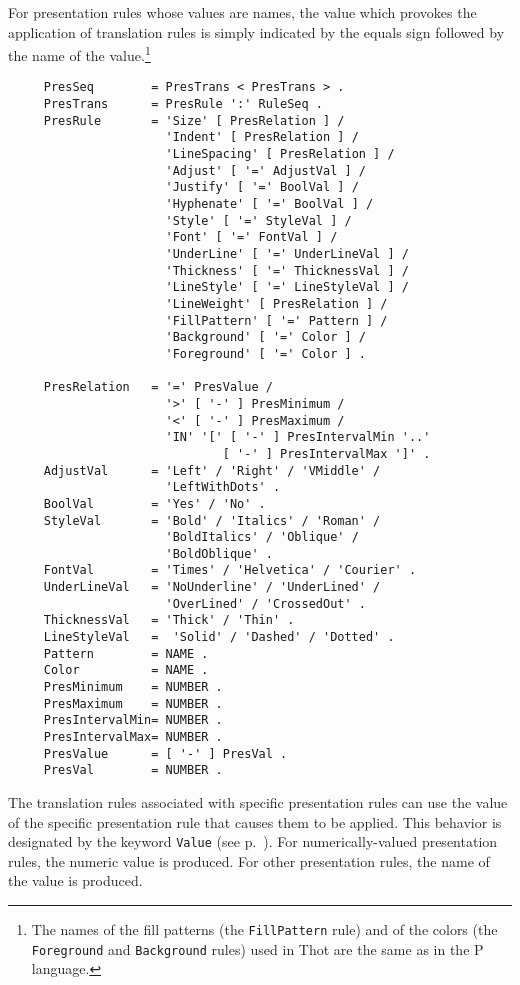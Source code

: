 For presentation rules whose values are names, the value which
provokes the application of translation rules is simply indicated by
the equals sign followed by the name of the value.\footnote{The names
of the fill patterns (the {\tt FillPattern} rule) and of the colors
(the {\tt Foreground} and {\tt Background} rules) used in Thot are the
same as in the P language.}

\begin{verbatim}
     PresSeq        = PresTrans < PresTrans > .
     PresTrans      = PresRule ':' RuleSeq .
     PresRule       = 'Size' [ PresRelation ] /
                      'Indent' [ PresRelation ] /
                      'LineSpacing' [ PresRelation ] /
                      'Adjust' [ '=' AdjustVal ] /
                      'Justify' [ '=' BoolVal ] /
                      'Hyphenate' [ '=' BoolVal ] /
                      'Style' [ '=' StyleVal ] /
                      'Font' [ '=' FontVal ] /
                      'UnderLine' [ '=' UnderLineVal ] /
                      'Thickness' [ '=' ThicknessVal ] /
                      'LineStyle' [ '=' LineStyleVal ] /
                      'LineWeight' [ PresRelation ] /
                      'FillPattern' [ '=' Pattern ] /
                      'Background' [ '=' Color ] /
                      'Foreground' [ '=' Color ] .

     PresRelation   = '=' PresValue /
                      '>' [ '-' ] PresMinimum /
                      '<' [ '-' ] PresMaximum /
                      'IN' '[' [ '-' ] PresIntervalMin '..'
                              [ '-' ] PresIntervalMax ']' .
     AdjustVal      = 'Left' / 'Right' / 'VMiddle' / 
                      'LeftWithDots' .
     BoolVal        = 'Yes' / 'No' .
     StyleVal       = 'Bold' / 'Italics' / 'Roman' /
                      'BoldItalics' / 'Oblique' /
                      'BoldOblique' .
     FontVal        = 'Times' / 'Helvetica' / 'Courier' .
     UnderLineVal   = 'NoUnderline' / 'UnderLined' /
                      'OverLined' / 'CrossedOut' .
     ThicknessVal   = 'Thick' / 'Thin' .
     LineStyleVal   =  'Solid' / 'Dashed' / 'Dotted' .
     Pattern        = NAME .
     Color          = NAME .
     PresMinimum    = NUMBER .
     PresMaximum    = NUMBER .
     PresIntervalMin= NUMBER .
     PresIntervalMax= NUMBER .
     PresValue      = [ '-' ] PresVal .
     PresVal        = NUMBER .
\end{verbatim}

\label{valpres}
The translation rules associated with specific presentation rules can
use the value of the specific presentation rule that causes them to be
applied.  This behavior is designated by the keyword {\tt Value}
(see p.~\pageref{create}).
For numerically-valued presentation rules, the numeric value is
produced.  For other presentation rules, the name of the value is
produced.

